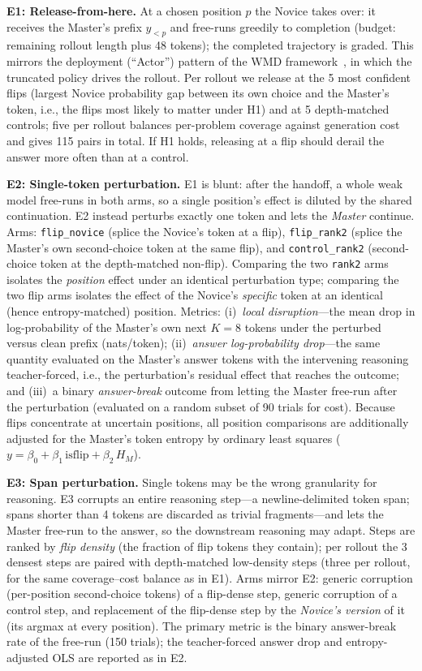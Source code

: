 \documentclass[times, 10pt,twocolumn]{article}
\begin{document}
\textbf{E1: Release-from-here.} At a chosen position $p$ the Novice takes over:
it receives the Master's prefix $y_{<p}$ and free-runs greedily to completion
(budget: remaining rollout length plus 48 tokens); the completed trajectory is
graded. This mirrors the deployment (``Actor'') pattern of the WMD
framework~\cite{till2026introspection}, in which the truncated policy drives
the rollout. Per rollout we release at the 5 most confident flips (largest
Novice probability gap between its own choice and the Master's token, i.e.,
the flips most likely to matter under H1) and at 5 depth-matched controls;
five per rollout balances per-problem coverage against generation cost and
gives 115 pairs in total. If H1 holds, releasing at a flip should derail the
answer more often than at a control.

\textbf{E2: Single-token perturbation.} E1 is blunt: after the handoff, a whole
weak model free-runs in both arms, so a single position's effect is diluted by
the shared continuation. E2 instead perturbs exactly one token and lets the
\emph{Master} continue. Arms: \texttt{flip\_novice} (splice the Novice's token
at a flip), \texttt{flip\_rank2} (splice the Master's own second-choice token
at the same flip), and \texttt{control\_rank2} (second-choice token at the
depth-matched non-flip). Comparing the two \texttt{rank2} arms isolates the
\emph{position} effect under an identical perturbation type; comparing the two
flip arms isolates the effect of the Novice's \emph{specific} token at an
identical (hence entropy-matched) position. Metrics: (i)~\emph{local
disruption}---the mean drop in log-probability of the Master's own next $K{=}8$
tokens under the perturbed versus clean prefix (nats/token); (ii)~\emph{answer
log-probability drop}---the same quantity evaluated on the Master's answer
tokens with the intervening reasoning teacher-forced, i.e., the perturbation's
residual effect that reaches the outcome; and (iii)~a binary
\emph{answer-break} outcome from letting the Master free-run after the
perturbation (evaluated on a random subset of 90 trials for cost). Because
flips concentrate at uncertain positions, all position comparisons are
additionally adjusted for the Master's token entropy by ordinary least squares
($y = \beta_0 + \beta_1\,\mathrm{isflip} + \beta_2\,H_M$).

\textbf{E3: Span perturbation.} Single tokens may be the wrong granularity for
reasoning. E3 corrupts an entire reasoning step---a newline-delimited token
span; spans shorter than 4 tokens are discarded as trivial fragments---and
lets the Master free-run to the answer, so the downstream reasoning may adapt.
Steps are ranked by \emph{flip density} (the fraction of flip tokens they
contain); per rollout the 3 densest steps are paired with depth-matched
low-density steps (three per rollout, for the same coverage--cost balance as
in E1). Arms mirror E2: generic
corruption (per-position second-choice tokens) of a flip-dense step, generic
corruption of a control step, and replacement of the flip-dense step by the
\emph{Novice's version} of it (its argmax at every position). The primary
metric is the binary answer-break rate of the free-run (150 trials); the
teacher-forced answer drop and entropy-adjusted OLS are reported as in E2.
\end{document}
